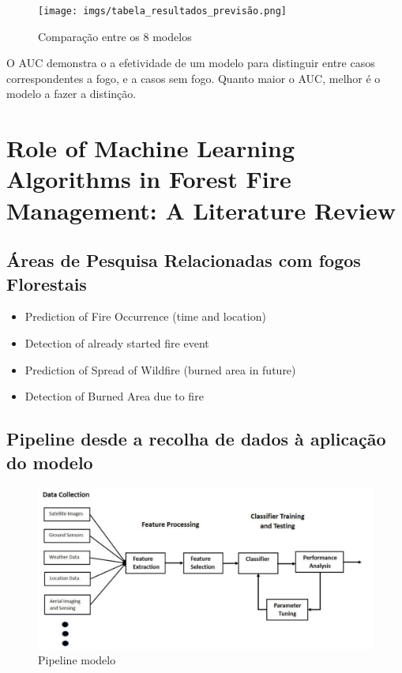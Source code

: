 \documentclass{article}
\begin{document}
\begin{figure}[H]
 \centering
  \texttt{[image: imgs/tabela\_resultados\_previsão.png]}
   \caption{\label{fig:model_comparison}Comparação entre os 8 modelos}
\end{figure}

O AUC demonstra o a efetividade de um modelo para distinguir entre casos correspondentes a fogo, e a casos sem fogo. Quanto maior o AUC, melhor é o modelo a fazer a distinção.


\section{Role of Machine Learning Algorithms in Forest Fire 
Management: A Literature Review \cite{arif2021role}}
\label{sec:Role of Machine Learning Algorithms in Forest Fire Management: A Literature Review}
\subsection{Áreas de Pesquisa Relacionadas com fogos Florestais}
\begin{itemize}
    \item Prediction of Fire Occurrence (time and location)
    \item Detection of already started fire event
    \item Prediction of Spread of Wildfire (burned area in future)
    \item Detection of Burned Area due to fire
\end{itemize}

\subsection{Pipeline desde a recolha de dados à aplicação do modelo}
\begin{figure}[ht]
 \centering
  \includegraphics[width=0.80\linewidth]{imgs/pipelina_data_ml.png}
   \caption{\label{fig:pipeline_modelo}Pipeline modelo}
\end{figure}
\end{document}
